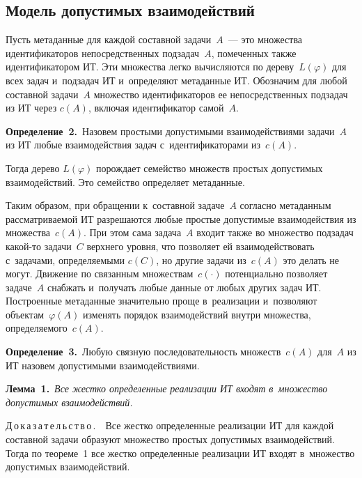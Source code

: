 \begin{multicols}{2}
\section{Модель допустимых взаимодействий}

   Пусть метаданные для каждой со\-став\-ной задачи~$A$~--- это множества 
идентификаторов непосредственных подзадач~$A$, помеченных также 
идентификатором ИТ. Эти множества легко вычисляются по дереву~$L(\varphi)$ 
для всех задач и~подзадач ИТ и~определяют метаданные ИТ. Обозначим для любой 
составной задачи~$A$ множество идентификаторов ее непосредственных 
подзадач из ИТ через $c(A)$, включая идентификатор самой~$A$.
   
  \medskip
  
  \noindent
  \textbf{Определение~2.}\ Назовем простыми допустимыми взаимодействиями 
задачи~$A$ из ИТ любые взаимодействия задач с~идентификаторами из~$c(A)$.
  
  Тогда дерево $L(\varphi)$ порождает семейство множеств прос\-тых допустимых 
взаимодействий. Это семейство определяет метаданные. 
  
  Таким образом, при обращении к~составной задаче~$A$ со\-глас\-но метаданным 
рас\-смат\-ри\-ва\-емой ИТ разрешаются любые прос\-тые до\-пус\-ти\-мые взаимодействия из 
множества~$c(A)$. При этом сама задача~$A$ входит так\-же во множество 
подзадач ка\-кой-то задачи~$C$ верхнего уровня, что позволяет ей 
взаимодействовать с~задачами, опре\-де\-ля\-емы\-ми $c(C)$, но другие задачи 
из~$c(A)$ это делать не могут. Движение по связанным множествам~$c(\cdot)$ 
потенциально позволяет задаче~$A$ снаб\-жать и~получать любые данные от 
любых других задач ИТ. Построенные метаданные значительно проще 
в~реализации и~позволяют объектам~$\varphi(A)$ изменять порядок 
взаимодействий внут\-ри множества, опре\-де\-ля\-емо\-го~$c(A)$.
   
  \medskip
  
  \noindent
  \textbf{Определение~3.}\ Любую связ\-ную по\-сле\-до\-ва\-тель\-ность 
множеств~$c(A)$ для~$A$ из ИТ назовем до\-пус\-ти\-мы\-ми взаимодействиями. 
  
  \medskip
  
  \noindent
  \textbf{Лемма~1.}\ \textit{Все жестко определенные реализации ИТ входят 
в~мно\-же\-ст\-во допустимых взаимодействий.}
  
  \medskip
  
  \noindent
  Д\,о\,к\,а\,з\,а\,т\,е\,л\,ь\,с\,т\,в\,о\,.\ \ Все жест\-ко определенные 
реализации ИТ для каждой со\-став\-ной задачи образуют мно\-же\-ст\-во прос\-тых 
допустимых взаимодействий. Тогда по тео\-ре\-ме~1 все жестко определенные 
реализации ИТ входят в~множество допустимых взаимодействий.
  

\end{multicols}
